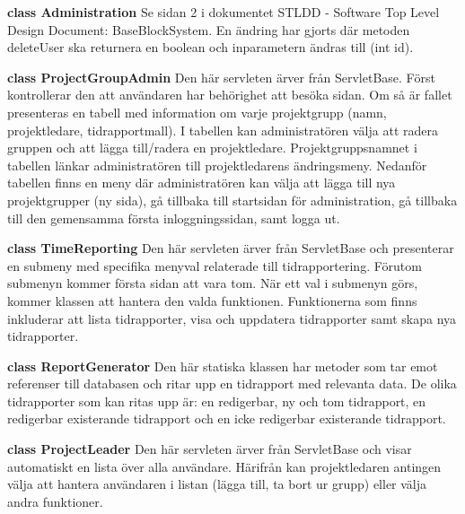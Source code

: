 \documentclass[a4paper]{article}
\begin{document}
\vspace{5mm}
\begin{hangparas}{1.5em}{1}
\textbf{class Administration} Se sidan 2 i dokumentet STLDD - Software Top Level Design Document: BaseBlockSystem. En ändring har gjorts där metoden deleteUser ska returnera en boolean och inparametern ändras till (int id).\end{hangparas}

\vspace{5mm}
\begin{hangparas}{1.5em}{1}
\textbf{class ProjectGroupAdmin} Den här servleten ärver från ServletBase. Först kontrollerar den att användaren har behörighet att besöka sidan. Om så är fallet presenteras en tabell med information om varje projektgrupp (namn, projektledare, tidrapportmall). I tabellen kan administratören välja att radera gruppen och att lägga till/radera en projektledare. Projektgruppsnamnet i tabellen länkar administratören till projektledarens ändringsmeny. Nedanför tabellen finns en meny där administratören kan välja att lägga till nya projektgrupper (ny sida), gå tillbaka till startsidan för administration, gå tillbaka till den gemensamma första inloggningssidan, samt logga ut.\end{hangparas}

\vspace{5mm}
\begin{hangparas}{1.5em}{1}
\textbf{class TimeReporting} Den här servleten ärver från ServletBase och presenterar en submeny med specifika menyval relaterade till tidrapportering. Förutom submenyn kommer första sidan att vara tom. När ett val i submenyn görs, kommer klassen att hantera den valda funktionen. Funktionerna som finns inkluderar att lista tidrapporter, visa och uppdatera tidrapporter samt skapa nya tidrapporter.\end{hangparas}

\vspace{5mm}
\begin{hangparas}{1.5em}{1}
\textbf{class ReportGenerator} Den här statiska klassen har metoder som tar emot referenser till databasen och ritar upp en tidrapport med relevanta data. De olika tidrapporter som kan ritas upp är: en redigerbar, ny och tom tidrapport, en redigerbar existerande tidrapport och en icke redigerbar existerande tidrapport.\end{hangparas}

\vspace{5mm}
\begin{hangparas}{1.5em}{1}
\textbf{class ProjectLeader} Den här servleten ärver från ServletBase och visar automatiskt en lista över alla användare. Härifrån kan projektledaren antingen välja att hantera användaren i listan (lägga till, ta bort ur grupp) eller välja andra funktioner. \end{hangparas}
\end{document}
